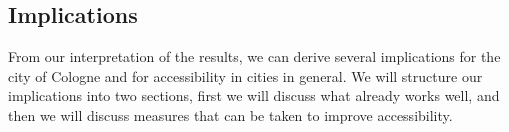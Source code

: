 


\subsection{Implications}
\label{sec:implications}

From our interpretation of the results, we can derive several implications for the city of Cologne and for accessibility in cities in general.
We will structure our implications into two sections, first we will discuss what already works well, and then we will discuss measures that can be taken to improve accessibility.

